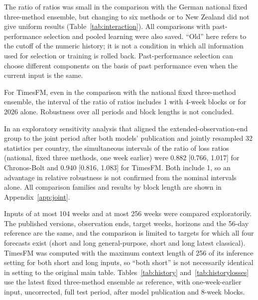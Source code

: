 \documentclass[11pt]{article}
\newcommand{\gentable}[1]{\adjustbox{max width=\linewidth}{}}
\begin{document}
\begin{table}[H]\centering\small
\caption{Relative loss increase from old to latest input for general-purpose and classical forecasts (exploratory). A ratio of ratios below 1 means a smaller relative loss increase for the general-purpose model. The four forecasts are compared together by resampling the same weeks; the interaction is not judged from the overlap of separate intervals. That the ratio of a fixed model equals 1 with identical input is a consistency check, not an empirical finding.}\label{tab:interaction}
\gentable{tab_interaction}
\end{table}

The ratio of ratios was small in the comparison with the German national fixed three-method ensemble, but changing to six methods or to New Zealand did not give uniform results (Table~\ref{tab:interaction}). All comparisons with past-performance selection and pooled learning were also saved. ``Old'' here refers to the cutoff of the numeric history; it is not a condition in which all information used for selection or training is rolled back. Past-performance selection can choose different components on the basis of past performance even when the current input is the same.

For TimesFM, even in the comparison with the national fixed three-method ensemble, the interval of the ratio of ratios includes 1 with 4-week blocks or for 2026 alone. Robustness over all periods and block lengths is not concluded.

In an exploratory sensitivity analysis that aligned the extended-observation-end group to the joint period after both models' publication and jointly resampled 32 statistics per country, the simultaneous intervals of the ratio of loss ratios (national, fixed three methods, one week earlier) were 0.882 [0.766, 1.017] for Chronos-Bolt and 0.940 [0.816, 1.083] for TimesFM. Both include 1, so an advantage in relative robustness is not confirmed from the nominal intervals alone. All comparison families and results by block length are shown in Appendix~\ref{app:joint}.

Inputs of at most 104 weeks and at most 256 weeks were compared exploratorily. The published versions, observation ends, target weeks, horizons and the 56-day reference are the same, and the comparison is limited to targets for which all four forecasts exist (short and long general-purpose, short and long latest classical). TimesFM was computed with the maximum context length of 256 of its inference setting for both short and long inputs, so ``both short'' is not necessarily identical in setting to the original main table. Tables~\ref{tab:history} and~\ref{tab:historylosses} use the latest fixed three-method ensemble as reference, with one-week-earlier input, uncorrected, full test period, after model publication and 8-week blocks.
\end{document}
